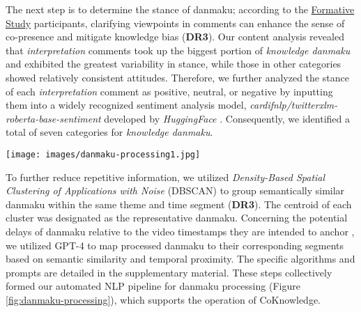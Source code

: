 The next step is to determine the stance of danmaku; according to the \hyperref[formative-study]{Formative Study} participants, clarifying viewpoints in comments can enhance the sense of co-presence and mitigate knowledge bias (\textbf{DR3}). 
Our content analysis revealed that \textit{interpretation} comments took up the biggest portion of \textit{knowledge danmaku} and exhibited the greatest variability in stance, while those in other categories showed relatively consistent attitudes.
Therefore, we further analyzed the stance of each \textit{interpretation} comment as positive, neutral, or negative by inputting them into a widely recognized sentiment analysis model, \textit{cardifnlp/twitterxlm-roberta-base-sentiment} \cite{barbieri2021xlm, wolf2020transformers} developed by \textit{HuggingFace} \cite{huggingface}. Consequently, we identified a total of seven categories for \textit{knowledge danmaku}. 
\begin{figure*}[h]
  \centering
  \texttt{[image: images/danmaku-processing1.jpg]}
  \caption{Danmaku processing pipeline for CoKnowledge. }\label{fig:danmaku-processing}
\end{figure*}

To further reduce repetitive information, we utilized \textit{Density-Based Spatial Clustering of Applications with Noise} (DBSCAN) \cite{ester1996density} to group semantically similar danmaku within the same theme and time segment (\textbf{DR3}). The centroid of each cluster was designated as the representative danmaku.
Concerning the potential delays of danmaku relative to the video timestamps they are intended to anchor \cite{ma2017video}, we utilized GPT-4 \cite{achiam2023gpt} to map processed danmaku to their corresponding segments based on semantic similarity and temporal proximity. The specific algorithms and prompts are detailed in the supplementary material.
These steps collectively formed our automated NLP pipeline for danmaku processing (Figure \ref{fig:danmaku-processing}), which supports the operation of CoKnowledge.



